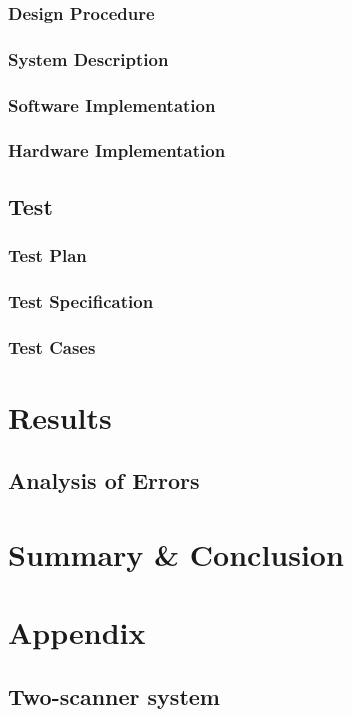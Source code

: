 \documentclass{article}
\begin{document}
\subsubsection{Design Procedure}
\subsubsection{System Description}
\subsubsection{Software Implementation}
\subsubsection{Hardware Implementation}

\subsection{Test}
\subsubsection{Test Plan}
\subsubsection{Test Specification}
\subsubsection{Test Cases}


\section{Results}
\subsection{Analysis of Errors}


\section{Summary \& Conclusion}


\section{Appendix}
  \subsection{Two-scanner system}
\end{document}
